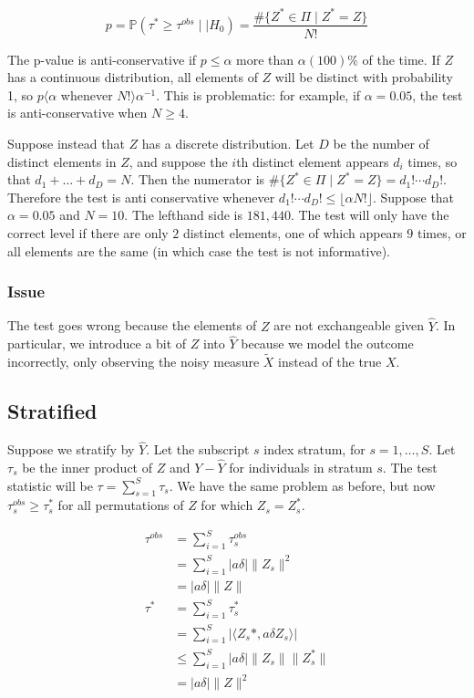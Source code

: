 \documentclass[12pt]{article}
\newcommand{\pr}{\mathbb{P}} %
\begin{document}
$$p = \pr( \tau^* \geq \tau^{obs} \mid\mid H_0) = \frac{\# \{Z^* \in \Pi \mid Z^*=Z \}}{ N!}$$

The p-value is anti-conservative if $p\leq \alpha$ more than $\alpha(100)\%$ of the time.
If $Z$ has a continuous distribution, all elements of $Z$ will be distinct with probability 1, so $p \langle  \alpha$ whenever $N! \rangle  \alpha^{-1}$.
This is problematic: for example, if $\alpha = 0.05$, the test is anti-conservative when $N \geq 4$.

Suppose instead that $Z$ has a discrete distribution.
Let $D$ be the number of distinct elements in $Z$, and suppose the $i$th distinct element appears $d_i$ times, so that $d_1 + \dots + d_D = N$.
Then the numerator is $\# \{Z^* \in \Pi \mid Z^*=Z \} = d_1! \cdots d_D!$.
Therefore the test is anti conservative whenever $d_1! \cdots d_D! \leq \lfloor{\alpha N!}\rfloor$.
Suppose that $\alpha = 0.05$ and $N=10$.
The lefthand side is $181,440$.
The test will only have the correct level if there are only $2$ distinct elements, one of which appears $9$ times, or all elements are the same (in which case the test is not informative).

\subsubsection{Issue}
The test goes wrong because the elements of $Z$ are not exchangeable given $\hat{Y}$.
In particular, we introduce a bit of $Z$ into $\hat{Y}$ because we model the outcome incorrectly, only observing the noisy measure $\tilde{X}$ instead of the true $X$.

\subsection{Stratified}
Suppose we stratify by $\hat{Y}$.
Let the subscript $s$ index stratum, for $s=1,\dots,S$.
Let $\tau_s$ be the inner product of $Z$ and $Y-\hat{Y}$ for individuals in stratum $s$.
The test statistic will be $\tau = \sum_{s=1}^S \tau_s$.
We have the same problem as before, but now $\tau_s^{obs} \geq \tau_s^*$ for all permutations of $Z$ for which $Z_s = Z^*_s$.


\begin{align*}
\tau^{obs} &= \sum_{i=1}^S \tau_s^{obs} \\
&= \sum_{i=1}^S \lvert a \delta \rvert \lVert Z_s \rVert^2 \\
&= \lvert a \delta \rvert \lVert Z \rVert \\
\tau^{*} &= \sum_{i=1}^S \tau_s^{*} \\
&= \sum_{i=1}^S \lvert \langle Z_s*, a\delta Z_s \rangle \rvert \\
&\leq \sum_{i=1}^S\lvert a \delta \rvert \lVert Z_s \rVert \lVert Z_s^* \rVert \tag*{by Cauchy-Schwarz} \\
&= \lvert a \delta \rvert \lVert Z \rVert^2
\end{align*}
\end{document}
